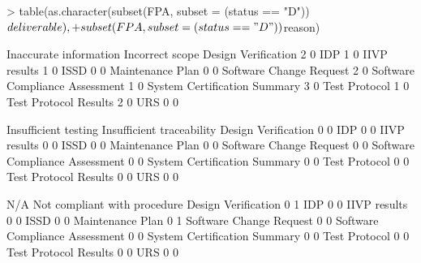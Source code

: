 \documentclass{article}
\begin{document}
\begin{Schunk}
\begin{Sinput}
> table(as.character(subset(FPA, subset = (status == "D"))$deliverable),
+       subset(FPA, subset = (status == "D"))$reason)
\end{Sinput}
\begin{Soutput}
                                 Inaccurate information Incorrect scope
  Design Verification                                 2               0
  IDP                                                 1               0
  IIVP results                                        1               0
  ISSD                                                0               0
  Maintenance Plan                                    0               0
  Software Change Request                             2               0
  Software Compliance Assessment                      1               0
  System Certification Summary                        3               0
  Test Protocol                                       1               0
  Test Protocol Results                               2               0
  URS                                                 0               0
                                
                                 Insufficient testing Insufficient traceability
  Design Verification                               0                         0
  IDP                                               0                         0
  IIVP results                                      0                         0
  ISSD                                              0                         0
  Maintenance Plan                                  0                         0
  Software Change Request                           0                         0
  Software Compliance Assessment                    0                         0
  System Certification Summary                      0                         0
  Test Protocol                                     0                         0
  Test Protocol Results                             0                         0
  URS                                               0                         0
                                
                                 N/A Not compliant with procedure
  Design Verification              0                            1
  IDP                              0                            0
  IIVP results                     0                            0
  ISSD                             0                            0
  Maintenance Plan                 0                            1
  Software Change Request          0                            0
  Software Compliance Assessment   0                            0
  System Certification Summary     0                            0
  Test Protocol                    0                            0
  Test Protocol Results            0                            0
  URS                              0                            0
                                

\end{Soutput}
\end{Schunk}
\end{document}
